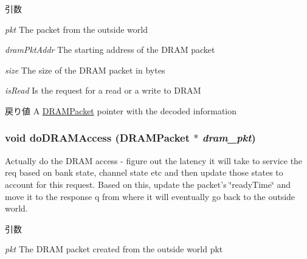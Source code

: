\begin{DoxyParams}{引数}
\item[{\em pkt}]The packet from the outside world \item[{\em dramPktAddr}]The starting address of the DRAM packet \item[{\em size}]The size of the DRAM packet in bytes \item[{\em isRead}]Is the request for a read or a write to DRAM \end{DoxyParams}
\begin{DoxyReturn}{戻り値}
A \hyperlink{classDRAMCtrl_1_1DRAMPacket}{DRAMPacket} pointer with the decoded information 
\end{DoxyReturn}
\hypertarget{classDRAMCtrl_a981a4462a622304ff598af5a232d7dd5}{
\subsubsection[{doDRAMAccess}]{\setlength{\rightskip}{0pt plus 5cm}void doDRAMAccess ({\bf DRAMPacket} $\ast$ {\em dram\_\-pkt})}}
\label{classDRAMCtrl_a981a4462a622304ff598af5a232d7dd5}
Actually do the DRAM access -\/ figure out the latency it will take to service the req based on bank state, channel state etc and then update those states to account for this request. Based on this, update the packet's \char`\"{}readyTime\char`\"{} and move it to the response q from where it will eventually go back to the outside world.


\begin{DoxyParams}{引数}
\item[{\em pkt}]The DRAM packet created from the outside world pkt \end{DoxyParams}



